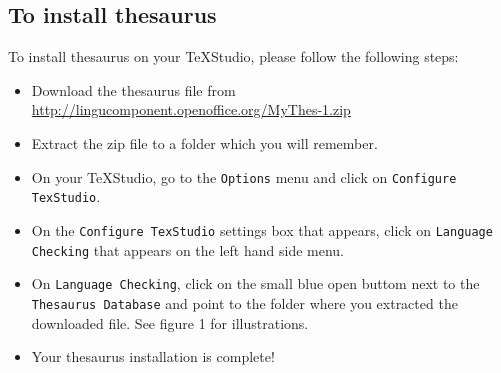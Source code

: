 \documentclass[]{article}
\begin{document}
\subsection*{To install thesaurus}
 To install thesaurus on your TeXStudio, please follow the following steps:
 \begin{itemize}
 	\item Download the thesaurus file from \url{http://lingucomponent.openoffice.org/MyThes-1.zip}
 	\item Extract the zip file to a folder which you will remember.
 	\item On your TeXStudio, go to the \texttt{Options} menu and click on \texttt{Configure TexStudio}.
 	\item On the \texttt{Configure TexStudio} settings box that appears, click on \texttt{Language Checking} that appears on the left hand side menu.
 	\item On \texttt{Language Checking}, click on the small blue open buttom  next to the \texttt{Thesaurus Database} and point to the folder where you extracted the downloaded file. See figure 1 for illustrations.
 	\item Your thesaurus installation is complete!
 \end{itemize}
\end{document}
